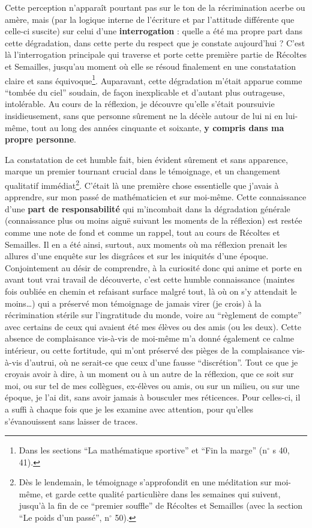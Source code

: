 Cette perception n'apparaît pourtant pas sur le ton de la récrimination acerbe ou amère, mais (par la logique interne de l'écriture et par l'attitude différente que celle-ci suscite) sur celui d'une \textbf{interrogation} : quelle a été ma propre part dans cette dégradation, dans cette perte du respect que je constate aujourd'hui ? C'est là l'interrogation principale qui traverse et porte cette première partie de Récoltes et Semailles, jusqu'au moment où elle se résoud finalement en une constatation claire et sans équivoque\footnote{Dans les sections ``La mathématique sportive'' et ``Fin la marge'' (n$^{\circ}$ s 40, 41).}. Auparavant, cette dégradation m'était apparue comme ``tombée du ciel'' soudain, de façon inexplicable et d'autant plus outrageuse, intolérable. Au cours de la réflexion, je découvre qu'elle s'était poursuivie insidieusement, sans que personne sûrement ne la décèle autour de lui ni en lui-même, tout au long des années cinquante et soixante, \textbf{y compris dans ma propre personne}.

La constatation de cet humble fait, bien évident sûrement et sans apparence, marque un premier tournant crucial dans le témoignage, et un changement qualitatif immédiat\footnote{Dès le lendemain, le témoignage s'approfondit en une méditation sur moi-même, et garde cette qualité particulière dans les semaines qui suivent, jusqu'à la fin de ce ``premier souffle'' de Récoltes et Semailles (avec la section ``Le poids d'un passé'', n$^{\circ}$ 50).}. C'était là une première chose essentielle que j'avais à apprendre, sur mon passé de mathématicien et sur moi-même. Cette connaissance d'une \textbf{part de responsabilité} qui m'incombait dans la dégradation générale (connaissance plus ou moins aiguë suivant les moments de la réflexion) est restée comme une note de fond et comme un rappel, tout au cours de Récoltes et Semailles. Il en a été ainsi, surtout, aux moments où ma réflexion prenait les allures d'une enquête sur les disgrâces et sur les iniquités d'une époque. Conjointement au désir de comprendre, à la curiosité donc qui anime et porte en avant tout vrai travail de découverte, c'est cette humble connaissance (maintes fois oubliée en chemin et refaisant surface malgré tout, là où on s'y attendait le moins\ldots) qui a préservé mon témoignage de jamais virer (je crois) à la récrimination stérile sur l'ingratitude du monde, voire au ``règlement de compte'' avec certains de ceux qui avaient été mes élèves ou des amis (ou les deux). Cette absence de complaisance vis-à-vis de moi-même m'a donné également ce calme intérieur, ou cette fortitude, qui m'ont préservé des pièges de la complaisance vis-à-vis d'autrui, où ne serait-ce que ceux d'une fausse ``discrétion''. Tout ce que je croyais avoir à dire, à un moment ou à un autre de la réflexion, que ce soit sur moi, ou sur tel de mes collègues, ex-élèves ou amis, ou sur un milieu, ou sur une époque, je l'ai dit, sans avoir jamais à bousculer mes réticences. Pour celles-ci, il a suffi à chaque fois que je les examine avec attention, pour qu'elles s'évanouissent sans laisser de traces.





